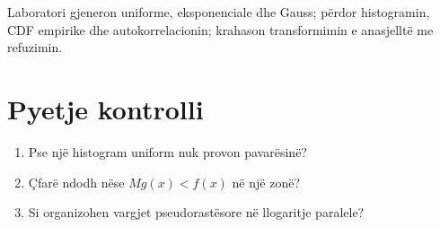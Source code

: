 \begin{lidhje}
Laboratori gjeneron uniforme, eksponenciale dhe Gauss; përdor histogramin, CDF empirike dhe autokorrelacionin; krahason transformimin e anasjelltë me refuzimin.
\end{lidhje}

\section*{Pyetje kontrolli}
\begin{enumerate}
\item Pse një histogram uniform nuk provon pavarësinë?
\item Çfarë ndodh nëse $Mg(x)<f(x)$ në një zonë?
\item Si organizohen vargjet pseudorastësore në llogaritje paralele?
\end{enumerate}



